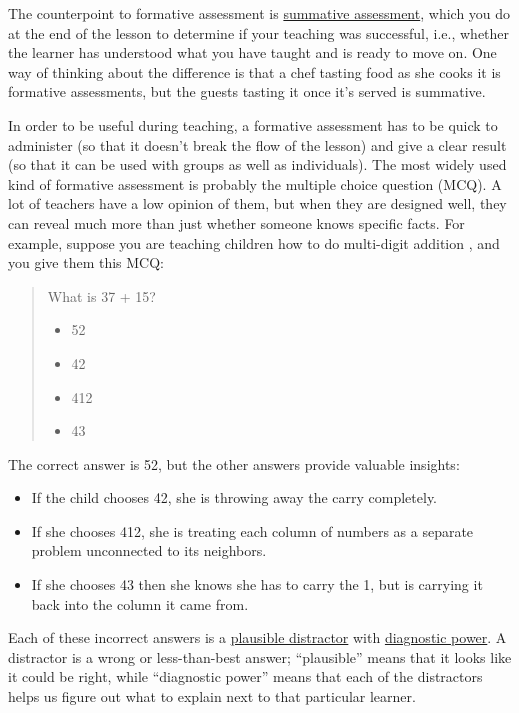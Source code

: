 The counterpoint to formative assessment is
\hyperlink{g:summative-assessment}{summative assessment}, which you do
at the end of the lesson to determine if your teaching was successful,
i.e., whether the learner has understood what you have taught and is
ready to move on. One way of thinking about the difference is that a
chef tasting food as she cooks it is formative assessments, but the
guests tasting it once it's served is summative.

In order to be useful during teaching, a formative assessment has to be
quick to administer (so that it doesn't break the flow of the lesson)
and give a clear result (so that it can be used with groups as well as
individuals). The most widely used kind of formative assessment is
probably the multiple choice question (MCQ). A lot of teachers have a
low opinion of them, but when they are designed well, they can reveal
much more than just whether someone knows specific facts. For example,
suppose you are teaching children how to do multi-digit addition
\cite{Ojos2015}, and you give them this MCQ:

\begin{quote}\setlength{\parindent}{0pt}
What is 37 + 15?

\begin{itemize}
\tightlist
\item
  52
\item
  42
\item
  412
\item
  43
\end{itemize}
\end{quote}

The correct answer is 52, but the other answers provide valuable
insights:

\begin{itemize}
\item
  If the child chooses 42, she is throwing away the carry completely.
\item
  If she chooses 412, she is treating each column of numbers as a
  separate problem unconnected to its neighbors.
\item
  If she chooses 43 then she knows she has to carry the 1, but is
  carrying it back into the column it came from.
\end{itemize}

Each of these incorrect answers is a \hyperlink{g:plausible-distractor}{plausible
distractor} with \hyperlink{g:diagnostic-power}{diagnostic
power}. A distractor is a wrong or less-than-best
answer; ``plausible'' means that it looks like it could be right, while
``diagnostic power'' means that each of the distractors helps us figure
out what to explain next to that particular learner.

